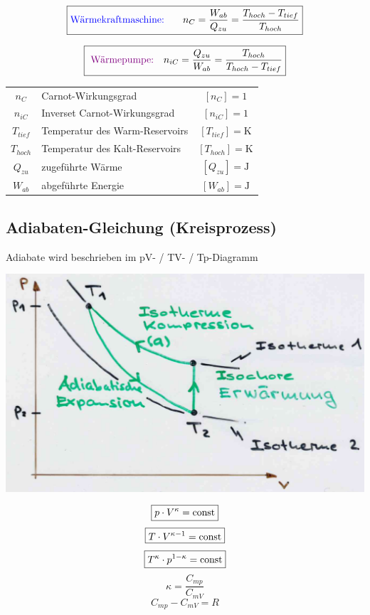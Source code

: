 $$ \boxed{\text{\textcolor{blue}{Wärmekraftmaschine: } }  \quad n_C = \frac{W_{ab}}{Q_{zu}} = \frac{T_{hoch}-T_{tief}}{T_{hoch}} }  $$


$$ \boxed{\text{ \textcolor{violet}{Wärmepumpe:}} \quad  n_{iC} = \frac{Q_{zu}}{W_{ab}} = \frac{T_{hoch}}{T_{hoch}-T_{tief}} }  $$



\begin{tabular}{c l c}
	$n_C$ & Carnot-Wirkungsgrad & $[n_C] = \mathrm{1}$ \\
	$n_{iC}$ & Inverset Carnot-Wirkungsgrad & $[n_{iC}] = \mathrm{1}$ \\
	$T_{tief}$ & Temperatur des Warm-Reservoirs & $[T_{tief}] = \mathrm{K}$ \\
	$T_{hoch}$ & Temperatur des Kalt-Reservoirs & $[T_{hoch}] = \mathrm{K}$  \\
	$Q_{zu}$ & zugeführte Wärme & $[Q_{zu}] = \mathrm{J}$ \\ 
	$W_{ab}$ & abgeführte Energie & $[W_{ab}] = \mathrm{J}$ \\ 
\end{tabular}







\subsection{Adiabaten-Gleichung (Kreisprozess)}
Adiabate wird beschrieben im pV- / TV- / Tp-Diagramm
\\


\begin{minipage}{0.6\linewidth}
\includegraphics[width=\linewidth]{Bilder/kreisprozess}
\end{minipage}
\hfill
\begin{minipage}{0.38\linewidth}
$$ \boxed{ p \cdot V^\kappa  = \mathrm{const} } $$
$$ \boxed{ T \cdot V^{\kappa -1} = \mathrm{const} } $$
$$ \boxed{ T^\kappa \cdot p^{1-\kappa} = \mathrm{const} } $$
$$ \kappa = \frac{C_{mp}}{C_{mV}}$$
$$ \boxed{ C_{mp} - C_{mV} = R }$$
\\
\end{minipage}




